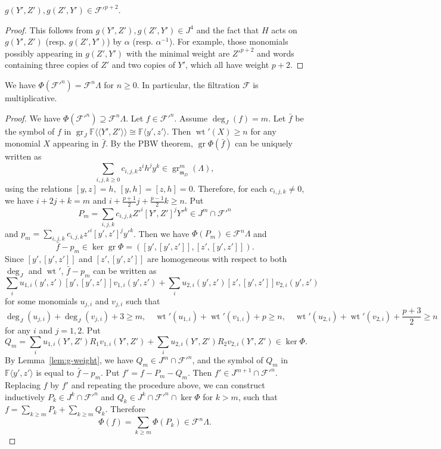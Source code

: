 \documentclass[11pt,a4paper]{article} %
\def\FF{\mathbb{F}}
\def\cF{\mathcal{F}}
\def\deg{\operatorname{deg}}
\def\gr{\operatorname{gr}}
\def\wet{\operatorname{wt}}
\begin{document}
\begin{lemma}\label{lem:g-weight}
    $g(Y',Z'),g(Z',Y')\in\cF'^{p+2}$.
\end{lemma}

\begin{proof}
    This follows from $g(Y',Z'),g(Z',Y')\in J^4$ and the fact that $H$ acts on $g(Y',Z')$ (resp. $g(Z',Y')$) by $\alpha$ (resp. $\alpha^{-1}$). For example, those monomials possibly appearing in $g(Z',Y')$ with the minimal weight are $Z'^{p+2}$ and words containing three copies of $Z'$ and two copies of $Y'$, which all have weight $p+2$.
\end{proof}

\begin{lemma}\label{lem:weight-multiplicative}
    We have $\Phi({\cF'}^n)=\cF^n\Lambda$ for $n\ge0$. In particular, the filtration $\cF$ is multiplicative.
\end{lemma}

\begin{proof}
We have $\Phi({\cF'}^n)\supseteq\cF^n\Lambda$. Let $f\in\cF'^n$. Assume $\deg_{J}(f)=m$. Let $\bar{f}$ be the symbol of $f$ in $\gr_J\FF\langle\langle Y',Z'\rangle\rangle\cong\FF\langle y',z'\rangle$. Then $\wet'(X)\ge n$ for any monomial $X$ appearing in $\bar{f}$. By the PBW theorem, $\gr\Phi(\bar{f})$ can be uniquely written as 
\[
\sum_{i,j,k\ge0}c_{i,j,k}z^ih^jy^k\in\gr^m_{\mathfrak{m}_D}(\Lambda),
\]
using the relations $[y,z]=h,~[y,h]=[z,h]=0$. Therefore, for each $c_{i,j,k}\ne0$, we have $i+2j+k=m$ and $i+\frac{p+1}{2}j+\frac{p-1}{2}k\ge n$. Put 
\[
P_m=\sum_{i,j,k}c_{i,j,k}Z'^i[Y',Z']^jY'^k\in J^m\cap{\cF'}^n
\]
and $p_m=\sum_{i,j,k}c_{i,j,k}z'^i[y',z']^jy'^k$. Then we have $\Phi(P_m)\in\cF^n\Lambda$ and
\[
\bar{f}-p_m\in\ker\gr\Phi=([y',[y',z']],[z',[y',z']]).
\]
Since $[y',[y',z']]$ and $[z',[y',z']]$ are homogeneous with respect to both $\deg_J$ and $\wet'$, $\bar{f}-p_m$ can be written as 
\[
\sum_i u_{1,i}(y',z')[y',[y',z']]v_{1,i}(y',z')+\sum_i u_{2,i}(y',z')[z',[y',z']]v_{2,i}(y',z')
\]
for some monomials $u_{j,i}$ and $v_{j,i}$ such that 
\[
\deg_J(u_{j,i})+\deg_J(v_{j,i})+3\ge m,\quad\wet'(u_{1,i})+\wet'(v_{1,i})+p\ge n,\quad\wet'(u_{2,i})+\wet'(v_{2,i})+\frac{p+3}{2}\ge n
\]
for any $i$ and $j=1,2$. Put 
\[
Q_m=\sum_i u_{1,i}(Y',Z')R_1v_{1,i}(Y',Z')+\sum_i u_{2,i}(Y',Z')R_2v_{2,i}(Y',Z')\in\ker\Phi.
\]
By Lemma~\ref{lem:g-weight}, we have $Q_m\in J^m\cap{\cF'}^n$, and the symbol of $Q_m$ in $\FF\langle y',z'\rangle$ is equal to $\bar{f}-p_m$. Put $f'=f-P_m-Q_m$. Then $f'\in J^{m+1}\cap{\cF'}^n$. Replacing $f$ by $f'$ and repeating the procedure above, we can construct inductively $P_k\in J^k\cap{\cF'}^n$ and $Q_k\in J^k\cap{\cF'}^n\cap\ker\Phi$ for $k>m$, such that $f=\sum_{k\ge m}P_k+\sum_{k\ge m}Q_k$. Therefore 
\[
\Phi(f)=\sum_{k\ge m}\Phi(P_k)\in\cF^n\Lambda.
\]
\end{proof}
\end{document}
